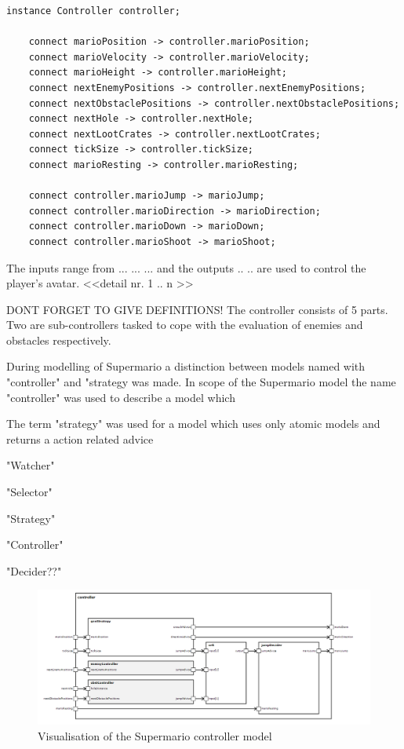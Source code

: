 \begin{lstlisting}[label=lst:marioWrapper, caption=Connectors of the Supermario Wrapper, morekeywords={ports, port, connect, in, out, instance, ->},
frame=single]
    instance Controller controller;
    
    connect marioPosition -> controller.marioPosition;
    connect marioVelocity -> controller.marioVelocity;
    connect marioHeight -> controller.marioHeight;
    connect nextEnemyPositions -> controller.nextEnemyPositions;
    connect nextObstaclePositions -> controller.nextObstaclePositions;
    connect nextHole -> controller.nextHole;
    connect nextLootCrates -> controller.nextLootCrates;
    connect tickSize -> controller.tickSize;
    connect marioResting -> controller.marioResting;
    
    connect controller.marioJump -> marioJump;
    connect controller.marioDirection -> marioDirection;
    connect controller.marioDown -> marioDown;
    connect controller.marioShoot -> marioShoot;
\end{lstlisting}

The inputs range from ... ... ... and the outputs .. .. are used to control the player's avatar.
<<detail nr. 1 .. n >>

DONT FORGET TO GIVE DEFINITIONS!
The controller consists of 5 parts. Two are sub-controllers tasked to cope with the evaluation of enemies and obstacles respectively.

During modelling of Supermario a distinction between models named with "controller" and "strategy was made.
In scope of the Supermario model the name "controller" was used to describe a model which 

The term "strategy" was used for a model which uses only atomic models and returns a action related advice 

"Watcher"

"Selector"

"Strategy"

"Controller"

"Decider??"

\begin{figure}
	\centering
	\includegraphics[scale=0.5]{pictures/haller_controller.PNG}
	\caption{Visualisation of the Supermario controller model}
	\label{fig:marioController}
\end{figure}

